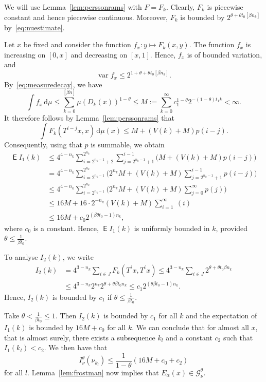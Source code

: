 \documentclass[AHL,Unicode,longabstracts]{cedram}
\DeclareMathOperator{\E}{\mathsf{E}}
\DeclareMathOperator{\var}{var}
\newcommand*{\dd}{\mathrm{d}}
\begin{document}
We will use Lemma~\ref{lem:perssonrams} with $F = F_k$. Clearly, $F_k$ is piecewise constant and hence piecewise continuous. Moreover, $F_k$ is bounded by $2^{\theta + \theta t_0 [\beta n_k]}$ by~\eqref{eq:nuestimate}.

Let $x$ be fixed and consider the function $f_x \colon y \mapsto F_k (x,y)$. The function $f_x$ is increasing on $[0,x]$ and decreasing on $[x,1]$. Hence, $f_x$ is of bounded variation, and
\[
\var f_x \leq 2^{1 + \theta + \theta t_0 [\beta n_k]}.
\]
By~\eqref{eq:measuredecay}, we have
\[
\int f_x \, \dd\mu \leq \sum_{k=0}^{[\beta n]} \mu (D_k (x))^{1-\theta} \leq M := \sum_{k=0}^\infty c_1^{1-\theta} 2^{- (1-\theta) t_1 k} < \infty.
\]
It therefore follows by Lemma~\ref{lem:perssonrams} that
\[
\int F_k (T^{i-j} x, x) \, \dd \mu (x) \leq M + (V(k) + M) p (i-j).
\]
Consequently, using that $p$ is summable, we obtain
\begin{align*}
\E I_1 (k) &\leq 4^{4-n_k} \sum_{i=2^{n_k-1}+2}^{2^{n_k}}
\sum_{j=2^{n_k-1}+1}^{i-1} \bigl(M + (V(k) + M) p (i-j) \bigr)
\\ &= 4^{4-n_k} \sum_{i=2^{n_k-1}}^{2^{n_k}} \bigl(2^{n_k} M + (V(k) + M) \sum_{j=2^{n_k-1}+1}^{i-1} p (i-j) \bigr) \\ &\leq 4^{4-n_k} \sum_{i=2^{n_k-1}}^{2^{n_k}} \bigl(2^{n_k} M + (V(k) + M)
\sum_{j=0}^\infty p (j) \bigr) \\ &\leq 16 M + 16 \cdot 2^{-n_k} (V(k) + M) \sum_{i=1}^\infty~(i) \\ & \leq 16 M + c_0 2^{(\beta
\theta t_0 -1) n_k},
\end{align*}
where $c_0$ is a constant. Hence, $\E I_1 (k)$ is uniformly bounded in $k$, provided $\theta \leq
\frac{1}{\beta t_0}$.

To analyse $I_2 (k)$, we write
\begin{align*}
I_2 (k) &= 4^{3-n_k} \sum_{i \in J} F_k (T^i x, T^i x) \leq 4^{3-n_k} \sum_{i \in J} 2^{\theta + \theta t_0 \beta n_k} \\ &\leq 4^{3-n_k} 2^{n_k} 2^{\theta + \theta \beta t_0 n_k} \leq c_1 2^{(\theta \beta t_0 - 1) n_k}.
\end{align*}
Hence, $I_2 (k)$ is bounded by $c_1$ if $\theta \leq \frac{1}{\beta t_0}$.

Take $\theta < \frac{1}{\beta t_0} \leq 1$. Then $I_2 (k)$ is bounded by $c_1$ for all $k$ and the expectation of $I_1 (k)$ is bounded by $16M + c_0$ for all $k$. We can conclude that for almost all $x$, that is almost surely, there exists a subsequence $k_l$ and a constant $c_2$ such that $I_1 (k_l) < c_2$. We then have that
\[
I_\nu^\theta (\nu_{k_l}) \leq \frac{1}{1-\theta} (16M + c_0 + c_2)
\]
for all $l$. Lemma~\ref{lem:frostman} now implies that $E_\alpha (x)
\in \mathscr{G}_\nu^\theta$.
\end{document}
